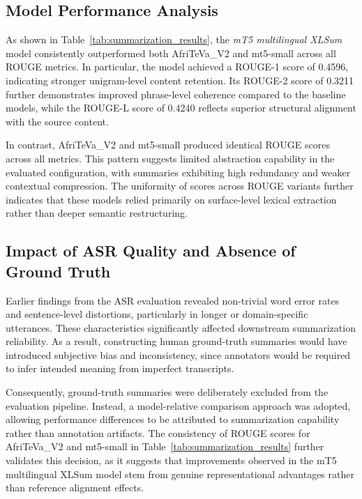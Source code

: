 \subsection{Model Performance Analysis}

As shown in Table~\ref{tab:summarization_results}, the \textit{mT5 multilingual XLSum} model consistently outperformed both AfriTeVa\_V2 and mt5-small across all ROUGE metrics. In particular, the model achieved a ROUGE-1 score of 0.4596, indicating stronger unigram-level content retention. Its ROUGE-2 score of 0.3211 further demonstrates improved phrase-level coherence compared to the baseline models, while the ROUGE-L score of 0.4240 reflects superior structural alignment with the source content.

In contrast, AfriTeVa\_V2 and mt5-small produced identical ROUGE scores across all metrics. This pattern suggests limited abstraction capability in the evaluated configuration, with summaries exhibiting high redundancy and weaker contextual compression. The uniformity of scores across ROUGE variants further indicates that these models relied primarily on surface-level lexical extraction rather than deeper semantic restructuring.

\subsection{Impact of ASR Quality and Absence of Ground Truth}

Earlier findings from the ASR evaluation revealed non-trivial word error rates and sentence-level distortions, particularly in longer or domain-specific utterances. These characteristics significantly affected downstream summarization reliability. As a result, constructing human ground-truth summaries would have introduced subjective bias and inconsistency, since annotators would be required to infer intended meaning from imperfect transcripts.

Consequently, ground-truth summaries were deliberately excluded from the evaluation pipeline. Instead, a model-relative comparison approach was adopted, allowing performance differences to be attributed to summarization capability rather than annotation artifacts. The consistency of ROUGE scores for AfriTeVa\_V2 and mt5-small in Table~\ref{tab:summarization_results} further validates this decision, as it suggests that improvements observed in the mT5 multilingual XLSum model stem from genuine representational advantages rather than reference alignment effects.

